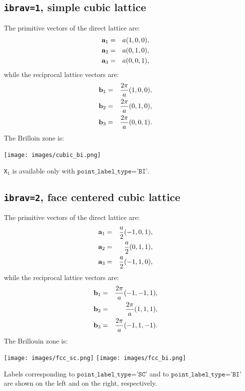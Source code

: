 \documentclass[12pt,a4paper]{article}
\begin{document}
\subsection{\texttt{ibrav=1}, simple cubic lattice}
The primitive vectors of the direct lattice are:
\begin{eqnarray}
{\bf a}_1 &=& a (1, 0, 0), \nonumber \\
{\bf a}_2 &=& a (0, 1, 0), \nonumber \\
{\bf a}_3 &=& a (0, 0, 1), \nonumber
\nonumber
\end{eqnarray}
while the reciprocal lattice vectors are:
\begin{eqnarray}
{\bf b}_1 &=& {2\pi \over a} (1, 0, 0), \nonumber \\
{\bf b}_2 &=& {2\pi \over a} (0, 1, 0), \nonumber \\
{\bf b}_3 &=& {2\pi \over a} (0, 0, 1). \nonumber
\nonumber
\end{eqnarray}
The Brilloin zone is:
\begin{center}
\texttt{[image: images/cubic\_bi.png]}
\end{center}
\texttt{X$_1$} is available only with $\texttt{point\_label\_type='BI'}$.

\subsection{\texttt{ibrav=2}, face centered cubic lattice}
The primitive vectors of the direct lattice are:
\begin{eqnarray}
{\bf a}_1 &=& {a \over 2} (-1, 0, 1), \nonumber \\
{\bf a}_2 &=& {a \over 2} (0, 1, 1), \nonumber \\
{\bf a}_3 &=& {a \over 2} (-1, 1, 0), \nonumber
\nonumber
\end{eqnarray}
while the reciprocal lattice vectors are:
\begin{eqnarray}
{\bf b}_1 &=& {2\pi \over a} (-1, -1, 1), \nonumber \\
{\bf b}_2 &=& {2\pi \over a} (1, 1, 1), \nonumber \\
{\bf b}_3 &=& {2\pi \over a} (-1, 1, -1). \nonumber
\nonumber
\end{eqnarray}
The Brillouin zone is:
\begin{center}
\texttt{[image: images/fcc\_sc.png]} \hspace{1.cm}
\texttt{[image: images/fcc\_bi.png]}
\end{center}
Labels corresponding to $\texttt{point\_label\_type='SC'}$ and to
$\texttt{point\_label\_type='BI'}$ are shown on the left and on the right, 
respectively.
\end{document}
